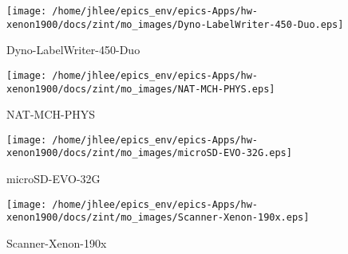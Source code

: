 \noindent
\vspace{1.4cm}
\begin{minipage}{.2\textwidth}
\begin{center}
\texttt{[image: /home/jhlee/epics\_env/epics-Apps/hw-xenon1900/docs/zint/mo\_images/Dyno-LabelWriter-450-Duo.eps]}
\end{center}
\end{minipage}
\begin{minipage}{.7\textwidth}
Dyno-LabelWriter-450-Duo
\end{minipage}


\noindent
\vspace{1.4cm}
\begin{minipage}{.2\textwidth}
\begin{center}
\texttt{[image: /home/jhlee/epics\_env/epics-Apps/hw-xenon1900/docs/zint/mo\_images/NAT-MCH-PHYS.eps]}
\end{center}
\end{minipage}
\begin{minipage}{.7\textwidth}
NAT-MCH-PHYS
\end{minipage}


\noindent
\vspace{1.4cm}
\begin{minipage}{.2\textwidth}
\begin{center}
\texttt{[image: /home/jhlee/epics\_env/epics-Apps/hw-xenon1900/docs/zint/mo\_images/microSD-EVO-32G.eps]}
\end{center}
\end{minipage}
\begin{minipage}{.7\textwidth}
microSD-EVO-32G
\end{minipage}


\noindent
\vspace{1.4cm}
\begin{minipage}{.2\textwidth}
\begin{center}
\texttt{[image: /home/jhlee/epics\_env/epics-Apps/hw-xenon1900/docs/zint/mo\_images/Scanner-Xenon-190x.eps]}
\end{center}
\end{minipage}
\begin{minipage}{.7\textwidth}
Scanner-Xenon-190x
\end{minipage}


